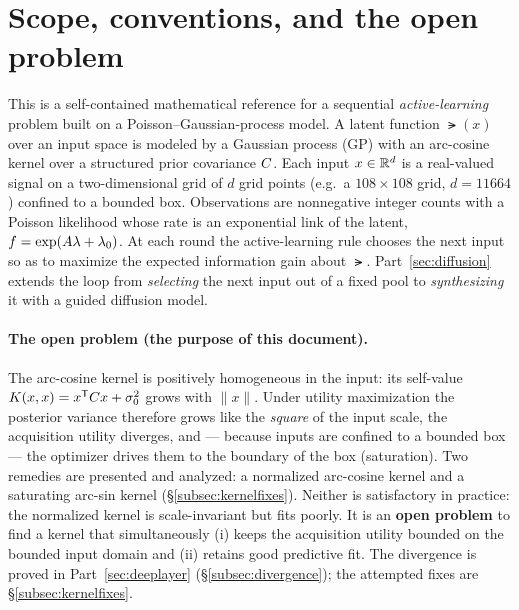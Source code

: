 \section*{Scope, conventions, and the open problem}

This is a self-contained mathematical reference for a sequential
\emph{active-learning} problem built on a Poisson--Gaussian-process model. A
latent function $\lat(x)$ over an input space is modeled by a Gaussian process
(GP) with an arc-cosine kernel over a structured prior covariance $C$. Each
input $x\in\mathbb{R}^{d}$ is a real-valued signal on a two-dimensional grid of $d$
grid points (e.g.\ a $108\times108$ grid, $d=11664$) confined to a bounded box.
Observations are nonnegative integer counts with a Poisson likelihood whose rate
is an exponential link of the latent, $f=\exp(A\lambda+\lambda_{0})$. At each round
the active-learning rule chooses the next input so as to maximize the expected
information gain about $\lat$. Part~\ref{sec:diffusion} extends the loop from
\emph{selecting} the next input out of a fixed pool to \emph{synthesizing} it with
a guided diffusion model.

\paragraph{The open problem (the purpose of this document).} The arc-cosine kernel
is positively homogeneous in the input: its self-value $K(x,x)=x^{\mathsf{T}}C
x+\sigma_{0}^{2}$ grows with $\lVert x\rVert$. Under utility maximization the posterior
variance therefore grows like the \emph{square} of the input scale, the
acquisition utility diverges, and --- because inputs are confined to a bounded box
--- the optimizer drives them to the boundary of the box (saturation). Two remedies
are presented and analyzed: a normalized arc-cosine kernel and a saturating arc-sin
kernel (\S\ref{subsec:kernelfixes}). Neither is satisfactory in practice: the
normalized kernel is scale-invariant but fits poorly. It is an \textbf{open
problem} to find a kernel that simultaneously (i) keeps the acquisition utility
bounded on the bounded input domain and (ii) retains good predictive fit. The
divergence is proved in Part~\ref{sec:deeplayer} (\S\ref{subsec:divergence}); the
attempted fixes are \S\ref{subsec:kernelfixes}.


